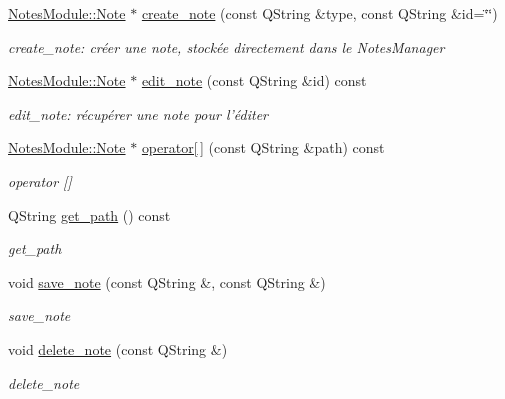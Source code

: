 \begin{DoxyCompactItemize}
\item 
\hyperlink{class_notes_module_1_1_note}{Notes\-Module\-::\-Note} $\ast$ \hyperlink{classworkspace_1_1_workspace_a555e62e540d13653a9a6680e93b44cd8}{create\-\_\-note} (const Q\-String \&type, const Q\-String \&id=\char`\"{}\char`\"{})
\begin{DoxyCompactList}\small\item\em create\-\_\-note\-: créer une note, stockée directement dans le Notes\-Manager \end{DoxyCompactList}\item 
\hyperlink{class_notes_module_1_1_note}{Notes\-Module\-::\-Note} $\ast$ \hyperlink{classworkspace_1_1_workspace_a64568fb22aa97ab7874cf8dba0a26ee0}{edit\-\_\-note} (const Q\-String \&id) const 
\begin{DoxyCompactList}\small\item\em edit\-\_\-note\-: récupérer une note pour l'éditer \end{DoxyCompactList}\item 
\hyperlink{class_notes_module_1_1_note}{Notes\-Module\-::\-Note} $\ast$ \hyperlink{classworkspace_1_1_workspace_a2e4fdc7d825069cfcec38dc5dc3060b4}{operator\mbox{[}$\,$\mbox{]}} (const Q\-String \&path) const 
\begin{DoxyCompactList}\small\item\em operator \mbox{[}\mbox{]} \end{DoxyCompactList}\item 
Q\-String \hyperlink{classworkspace_1_1_workspace_a1a66b35b3c44dba8f729814ff8af4328}{get\-\_\-path} () const 
\begin{DoxyCompactList}\small\item\em get\-\_\-path \end{DoxyCompactList}\item 
void \hyperlink{classworkspace_1_1_workspace_aa87dbe4a01822696c551bf56d9912f0e}{save\-\_\-note} (const Q\-String \&, const Q\-String \&)
\begin{DoxyCompactList}\small\item\em save\-\_\-note \end{DoxyCompactList}\item 
void \hyperlink{classworkspace_1_1_workspace_ae69a9277bdff9c37fa8cfe440f8a4c30}{delete\-\_\-note} (const Q\-String \&)
\begin{DoxyCompactList}\small\item\em delete\-\_\-note \end{DoxyCompactList}\item 

\end{DoxyCompactItemize}
